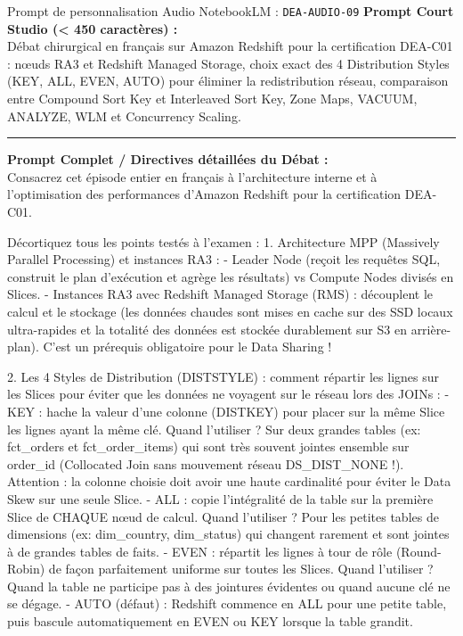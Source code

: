 \documentclass[11pt,a4paper]{article}
\begin{document}
\begin{promptbox}{Prompt de personnalisation Audio NotebookLM : \texttt{DEA-AUDIO-09}}
\textbf{Prompt Court Studio (< 450 caractères) :}\\
Débat chirurgical en français sur Amazon Redshift pour la certification DEA-C01 : nœuds RA3 et Redshift Managed Storage, choix exact des 4 Distribution Styles (KEY, ALL, EVEN, AUTO) pour éliminer la redistribution réseau, comparaison entre Compound Sort Key et Interleaved Sort Key, Zone Maps, VACUUM, ANALYZE, WLM et Concurrency Scaling.

\medskip\hrule\medskip
\textbf{Prompt Complet / Directives détaillées du Débat :}\\
Consacrez cet épisode entier en français à l'architecture interne et à l'optimisation des performances d'Amazon Redshift pour la certification DEA-C01.

Décortiquez tous les points testés à l'examen :
1. Architecture MPP (Massively Parallel Processing) et instances RA3 :
- Leader Node (reçoit les requêtes SQL, construit le plan d'exécution et agrège les résultats) vs Compute Nodes divisés en Slices.
- Instances RA3 avec Redshift Managed Storage (RMS) : découplent le calcul et le stockage (les données chaudes sont mises en cache sur des SSD locaux ultra-rapides et la totalité des données est stockée durablement sur S3 en arrière-plan). C'est un prérequis obligatoire pour le Data Sharing !

2. Les 4 Styles de Distribution (DISTSTYLE) : comment répartir les lignes sur les Slices pour éviter que les données ne voyagent sur le réseau lors des JOINs :
- KEY : hache la valeur d'une colonne (DISTKEY) pour placer sur la même Slice les lignes ayant la même clé. Quand l'utiliser ? Sur deux grandes tables (ex: fct\_orders et fct\_order\_items) qui sont très souvent jointes ensemble sur order\_id (Collocated Join sans mouvement réseau DS\_DIST\_NONE !). Attention : la colonne choisie doit avoir une haute cardinalité pour éviter le Data Skew sur une seule Slice.
- ALL : copie l'intégralité de la table sur la première Slice de CHAQUE nœud de calcul. Quand l'utiliser ? Pour les petites tables de dimensions (ex: dim\_country, dim\_status) qui changent rarement et sont jointes à de grandes tables de faits.
- EVEN : répartit les lignes à tour de rôle (Round-Robin) de façon parfaitement uniforme sur toutes les Slices. Quand l'utiliser ? Quand la table ne participe pas à des jointures évidentes ou quand aucune clé ne se dégage.
- AUTO (défaut) : Redshift commence en ALL pour une petite table, puis bascule automatiquement en EVEN ou KEY lorsque la table grandit.


\end{promptbox}
\end{document}
